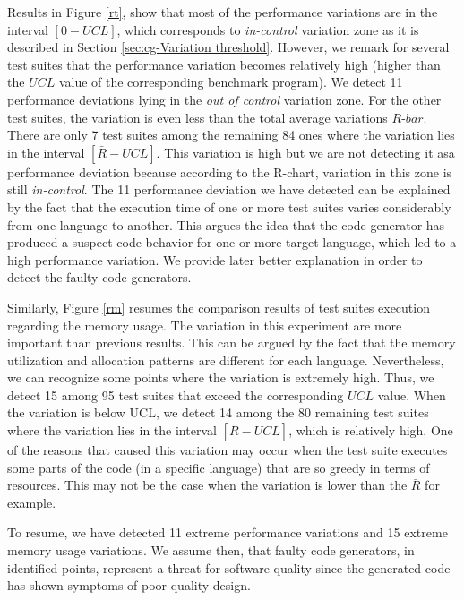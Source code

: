 Results in Figure \ref{rt}, show that most of the performance variations are in the interval $[0-UCL]$, which corresponds to \textit{in-control} variation zone as it is described in Section \ref{sec:cg-Variation threshold}. However, we remark for several test suites that the performance variation becomes relatively high (higher than the $UCL$ value of the corresponding benchmark program). We detect 11 performance deviations lying in the \textit{out of control} variation zone. For the other test suites, the variation is even less than the total average variations $R$-$bar$. There are only 7 test suites among the remaining 84 ones where the variation lies in the interval $[\bar{R}-UCL]$. This variation is high but we are not detecting it asa performance deviation because according to the R-chart, variation in this zone is still \textit{in-control}. 
The 11 performance deviation we have detected can be explained by the fact that the execution time of one or more test suites varies considerably from one language to another. This argues the idea that the code generator has produced a suspect code behavior for one or more target language, which led to a high performance variation. We provide later better explanation in order to detect the faulty code generators.

Similarly, Figure \ref{rm} resumes the comparison results of test suites execution regarding the memory usage. The variation in this experiment are more important than previous results. This can be argued by the fact that the memory utilization and allocation patterns are different for each language. Nevertheless, we can recognize some points where the variation is extremely high. Thus, we detect 15 among 95 test suites that exceed the corresponding $UCL$ value. 
When the variation is below UCL, we detect 14 among the 80 remaining test suites where the variation lies in the interval $[\bar{R}-UCL]$, which is relatively high. 
One of the reasons that caused this variation may occur when the test suite executes some parts of the code (in a specific language) that are so greedy in terms of resources. This may not be the case when the variation is lower than the $\bar{R}$ for example.


To resume, we have detected 11 extreme performance variations and 15 extreme memory usage variations. We assume then, that faulty code generators, in identified points, represent a threat for software quality since the generated code has shown symptoms of poor-quality design. 



